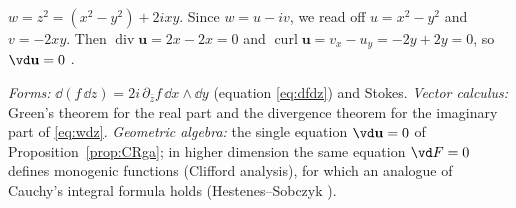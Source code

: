 \begin{example}\label{ex:monogenic}
$w=z^2=(x^2-y^2)+2ixy$. Since $w=u-iv$, we read off $u=x^2-y^2$ and $v=-2xy$. Then $\operatorname{div}\mathbf u=2x-2x=0$ and $\operatorname{curl}\mathbf u=v_x-u_y=-2y+2y=0$, so $\vd\mathbf u=0$ \checkmark.
\end{example}

\begin{synthesis}
\emph{Forms:} $\dd(f\,\dd z)=2i\,\partial_{\bar z}f\,\dd x\wedge\dd y$ (equation \eqref{eq:dfdz}) and Stokes. \emph{Vector calculus:} Green's theorem for the real part and the divergence theorem for the imaginary part of \eqref{eq:wdz}. \emph{Geometric algebra:} the single equation $\vd\mathbf u=0$ of Proposition~\ref{prop:CRga}; in higher dimension the same equation $\vd F=0$ defines monogenic functions (Clifford analysis), for which an analogue of Cauchy's integral formula holds (Hestenes--Sobczyk \cite{HS}).
\end{synthesis}
